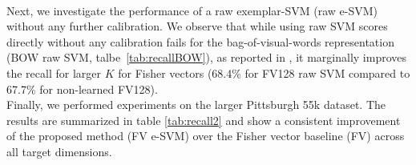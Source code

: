 \documentclass[10pt,twocolumn,letterpaper]{article}
\begin{document}
         \\
         Next, we investigate the performance of a raw exemplar-SVM (raw e-SVM) without any further calibration. We observe that while using raw SVM scores directly without any calibration fails for the bag-of-visual-words representation (BOW raw SVM, talbe~\ref{tab:recallBOW}), as reported in \cite{Gronat13}, it marginally improves the recall for larger $K$ for Fisher vectors (68.4\% for FV128 raw SVM compared to 67.7\% for non-learned FV128).
         \\
         Finally, we performed experiments on the larger Pittsburgh 55k dataset. The results are summarized in table \ref{tab:recall2} and show a consistent improvement of the proposed method (FV e-SVM) over the Fisher vector baseline (FV) across all target dimensions. 
      
\end{document}
